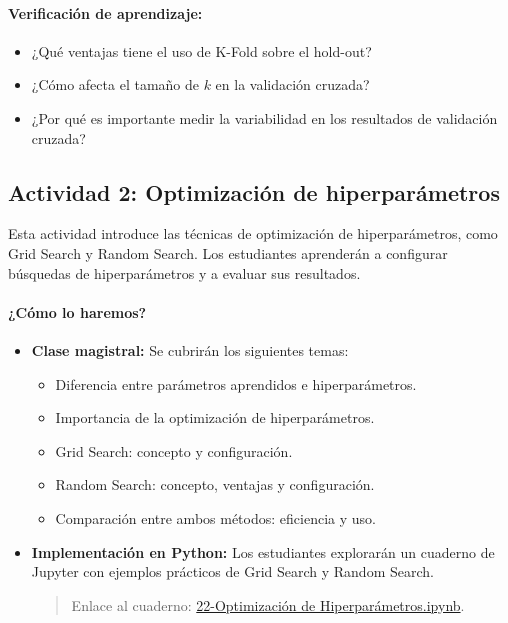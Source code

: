 \documentclass[a4,11pt]{aleph-notas}
\begin{document}
\paragraph{Verificación de aprendizaje:}  
\begin{itemize}[leftmargin=*]
    \item ¿Qué ventajas tiene el uso de K-Fold sobre el hold-out?
    \item ¿Cómo afecta el tamaño de \(k\) en la validación cruzada?
    \item ¿Por qué es importante medir la variabilidad en los resultados de validación cruzada?
\end{itemize}

\subsection*{Actividad 2: Optimización de hiperparámetros}

Esta actividad introduce las técnicas de optimización de hiperparámetros, como Grid Search y Random Search. Los estudiantes aprenderán a configurar búsquedas de hiperparámetros y a evaluar sus resultados.

\paragraph{¿Cómo lo haremos?}  
\begin{itemize}[leftmargin=*]
    \item \textbf{Clase magistral:} Se cubrirán los siguientes temas:
    \begin{itemize}
        \item Diferencia entre parámetros aprendidos e hiperparámetros.
        \item Importancia de la optimización de hiperparámetros.
        \item Grid Search: concepto y configuración.
        \item Random Search: concepto, ventajas y configuración.
        \item Comparación entre ambos métodos: eficiencia y uso.
    \end{itemize}
    \item \textbf{Implementación en Python:} Los estudiantes explorarán un cuaderno de Jupyter con ejemplos prácticos de Grid Search y Random Search.
    \begin{quote}
        Enlace al cuaderno: \href{https://colab.research.google.com/github/andres-merino/AprendizajeAutomaticoInicial-05-N0105/blob/main/2-Notebooks/22-Optimizacion-Hiperparametros.ipynb}{22-Optimización de Hiperparámetros.ipynb}.
    \end{quote}
\end{itemize}
\end{document}
